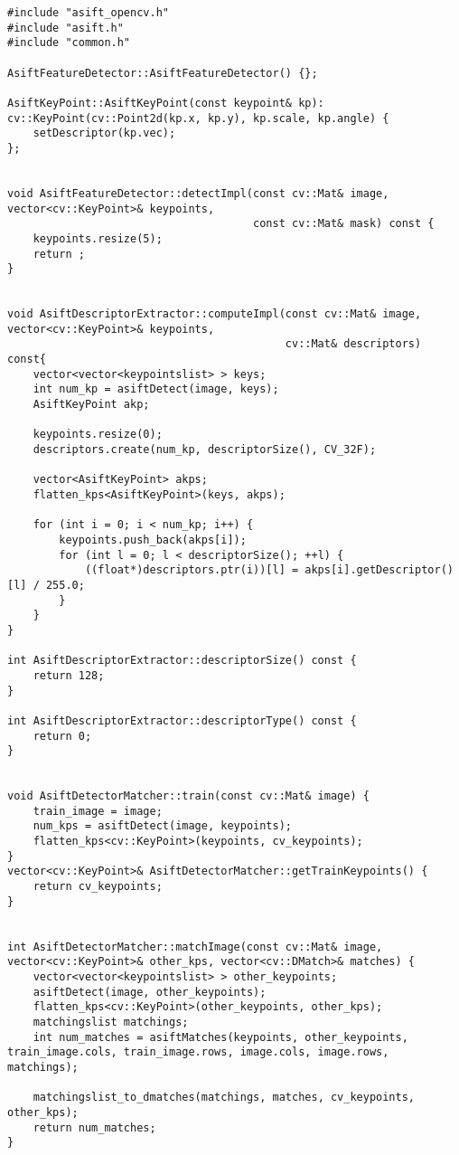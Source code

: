 \begin{lstlisting}
#include "asift_opencv.h"
#include "asift.h"
#include "common.h"

AsiftFeatureDetector::AsiftFeatureDetector() {};

AsiftKeyPoint::AsiftKeyPoint(const keypoint& kp): cv::KeyPoint(cv::Point2d(kp.x, kp.y), kp.scale, kp.angle) {
    setDescriptor(kp.vec);
};


void AsiftFeatureDetector::detectImpl(const cv::Mat& image, vector<cv::KeyPoint>& keypoints,
                                      const cv::Mat& mask) const {
    keypoints.resize(5);
    return ;
}


void AsiftDescriptorExtractor::computeImpl(const cv::Mat& image, vector<cv::KeyPoint>& keypoints,
                                           cv::Mat& descriptors) const{
    vector<vector<keypointslist> > keys;
    int num_kp = asiftDetect(image, keys);
    AsiftKeyPoint akp;
    
    keypoints.resize(0);
    descriptors.create(num_kp, descriptorSize(), CV_32F);
    
    vector<AsiftKeyPoint> akps;
    flatten_kps<AsiftKeyPoint>(keys, akps);
    
    for (int i = 0; i < num_kp; i++) {
        keypoints.push_back(akps[i]);
        for (int l = 0; l < descriptorSize(); ++l) {
            ((float*)descriptors.ptr(i))[l] = akps[i].getDescriptor()[l] / 255.0;
        }
    }
}

int AsiftDescriptorExtractor::descriptorSize() const {
    return 128;
}

int AsiftDescriptorExtractor::descriptorType() const {
    return 0;
}


void AsiftDetectorMatcher::train(const cv::Mat& image) {
    train_image = image;
    num_kps = asiftDetect(image, keypoints);
    flatten_kps<cv::KeyPoint>(keypoints, cv_keypoints);
}
vector<cv::KeyPoint>& AsiftDetectorMatcher::getTrainKeypoints() {
    return cv_keypoints;
}


int AsiftDetectorMatcher::matchImage(const cv::Mat& image, vector<cv::KeyPoint>& other_kps, vector<cv::DMatch>& matches) {
    vector<vector<keypointslist> > other_keypoints;
    asiftDetect(image, other_keypoints);
    flatten_kps<cv::KeyPoint>(other_keypoints, other_kps);
    matchingslist matchings;
    int num_matches = asiftMatches(keypoints, other_keypoints, train_image.cols, train_image.rows, image.cols, image.rows, matchings);
    
    matchingslist_to_dmatches(matchings, matches, cv_keypoints, other_kps);
    return num_matches;
}

\end{lstlisting}

